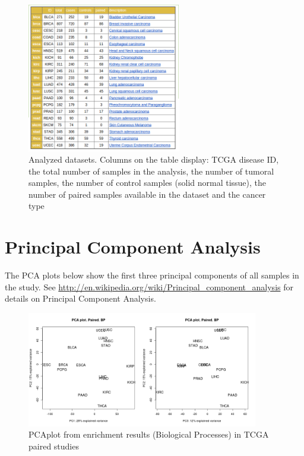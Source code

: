 \documentclass[a4paper,12pt]{article}
\begin{document}
\begin{figure}[!h] 
\centering 
\includegraphics[width=0.6\textwidth]{img/table1.png} 
\caption{Analyzed datasets. Columns on the table display: TCGA disease ID, the total number of samples in the  analysis, the 
 number of tumoral samples, the number  of control samples  (solid  normal tissue), the number of paired samples available in the 
 dataset and the cancer type} 
\label{figDESCRIPTION} 
\end{figure} 

\clearpage



\section{Principal Component Analysis}

The PCA plots below show the first three principal components of all samples in the study. 
See \url{http://en.wikipedia.org/wiki/Principal_component_analysis} for details on Principal Component Analysis.

\begin{figure}[!h] 
\centering 
\includegraphics[width=0.9\textwidth]{img/pca_bp_paired.png} 
\caption{PCAplot from enrichment results (Biological Processes) in TCGA paired studies} 
\label{figPCA_bp_paired} 
\end{figure} 
\end{document}
